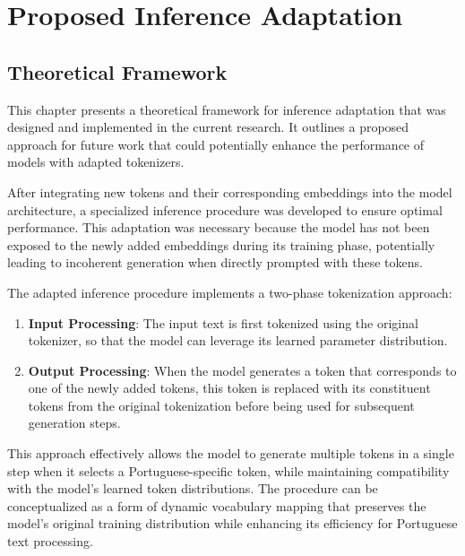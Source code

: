 
\chapter{Proposed Inference Adaptation}


\label{chap:inference_adaptation}

\section{Theoretical Framework}
This chapter presents a theoretical framework for inference adaptation that was designed and implemented in the current research. It outlines a proposed approach for future work that could potentially enhance the performance of models with adapted tokenizers.

After integrating new tokens and their corresponding embeddings into the model architecture, a specialized inference procedure was developed to ensure optimal performance. This adaptation was necessary because the model has not been exposed to the newly added embeddings during its training phase, potentially leading to incoherent generation when directly prompted with these tokens.

The adapted inference procedure implements a two-phase tokenization approach:

\begin{enumerate}
    \item \textbf{Input Processing}: The input text is first tokenized using the original tokenizer, so that the model can leverage its learned parameter distribution.
    
    \item \textbf{Output Processing}: When the model generates a token that corresponds to one of the newly added tokens, this token is replaced with its constituent tokens from the original tokenization before being used for subsequent generation steps.
\end{enumerate}

This approach effectively allows the model to generate multiple tokens in a single step when it selects a Portuguese-specific token, while maintaining compatibility with the model's learned token distributions. The procedure can be conceptualized as a form of dynamic vocabulary mapping that preserves the model's original training distribution while enhancing its efficiency for Portuguese text processing.

